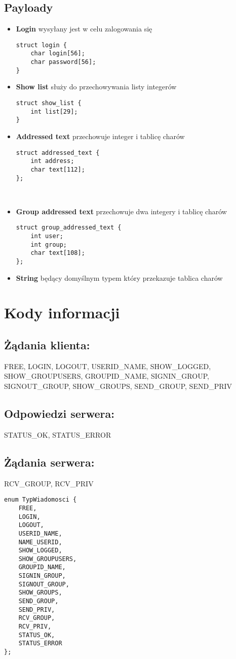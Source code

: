 \documentclass[a4paper]{article}
\begin{document}
\subsection{Payloady}
\begin{itemize}
\item \textbf{Login} wysyłany jest w celu zalogowania się
\begin{verbatim}
struct login {
    char login[56];
    char password[56];
}
\end{verbatim}

\item \textbf{Show list} służy do przechowywania listy integerów
\begin{verbatim}
struct show_list {
	int list[29];
}
\end{verbatim}

\item \textbf{Addressed text} przechowuje integer i tablicę charów
\begin{verbatim}
struct addressed_text {
    int address;
    char text[112];
};
\end{verbatim}
\\
\item \textbf{Group addressed text} przechowuje dwa integery i tablicę charów
\begin{verbatim}
struct group_addressed_text {
    int user;
    int group;
    char text[108];
};
\end{verbatim}

\item \textbf{String} będący domyślnym typem który przekazuje tablica charów
\end{itemize}
\section{Kody informacji}
\subsection{Żądania klienta:} FREE, LOGIN, LOGOUT, USERID\_NAME, SHOW\_LOGGED, SHOW\_GROUPUSERS, GROUPID\_NAME, SIGNIN\_GROUP, SIGNOUT\_GROUP, SHOW\_GROUPS, SEND\_GROUP, SEND\_PRIV
\subsection{Odpowiedzi serwera:} STATUS\_OK, STATUS\_ERROR
\subsection{Żądania serwera:} RCV\_GROUP, RCV\_PRIV
\begin{verbatim}
enum TypWiadomosci {
    FREE,
    LOGIN,
    LOGOUT,
    USERID_NAME,
    NAME_USERID,
    SHOW_LOGGED,
    SHOW_GROUPUSERS,
    GROUPID_NAME,
    SIGNIN_GROUP,
    SIGNOUT_GROUP,
    SHOW_GROUPS,
    SEND_GROUP,
    SEND_PRIV,
    RCV_GROUP,
    RCV_PRIV,
    STATUS_OK,
    STATUS_ERROR
};
\end{verbatim}
\end{document}
